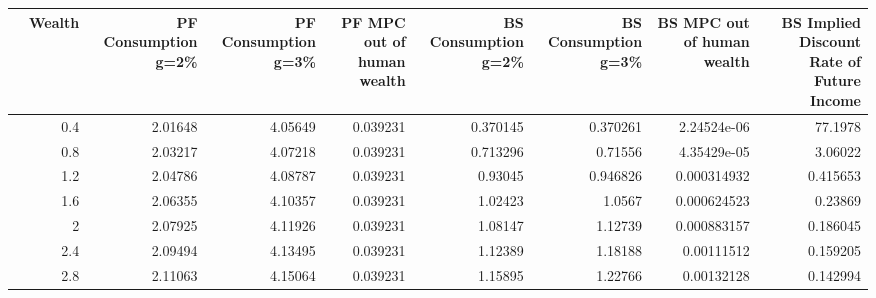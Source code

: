 \begin{tabular}{lrrrrrrrr}
\hline
    &   Wealth &   PF Consumption g=2\% &   PF Consumption g=3\% &   PF MPC out of human wealth &   BS Consumption g=2\% &   BS Consumption g=3\% &   BS MPC out of human wealth &   BS Implied Discount Rate of Future Income \\
\hline
    &      0.4 &               2.01648 &               4.05649 &                     0.039231 &              0.370145 &              0.370261 &                  2.24524e-06 &                                   77.1978   \\
    &      0.8 &               2.03217 &               4.07218 &                     0.039231 &              0.713296 &              0.71556  &                  4.35429e-05 &                                    3.06022  \\
    &      1.2 &               2.04786 &               4.08787 &                     0.039231 &              0.93045  &              0.946826 &                  0.000314932 &                                    0.415653 \\
    &      1.6 &               2.06355 &               4.10357 &                     0.039231 &              1.02423  &              1.0567   &                  0.000624523 &                                    0.23869  \\
    &      2   &               2.07925 &               4.11926 &                     0.039231 &              1.08147  &              1.12739  &                  0.000883157 &                                    0.186045 \\
    &      2.4 &               2.09494 &               4.13495 &                     0.039231 &              1.12389  &              1.18188  &                  0.00111512  &                                    0.159205 \\
    &      2.8 &               2.11063 &               4.15064 &                     0.039231 &              1.15895  &              1.22766  &                  0.00132128  &                                    0.142994 \\
\hline
\end{tabular}